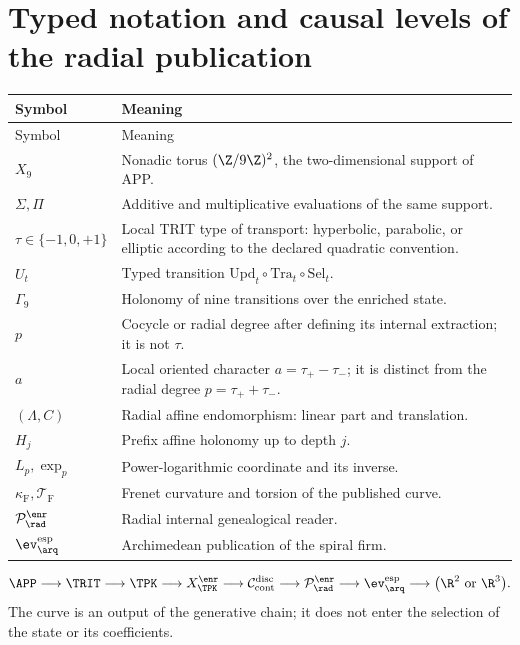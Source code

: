 \part{Typed notation and causal levels of the radial publication}
\begin{longtable}{>{\raggedright\arraybackslash}p{}p{}}
\toprule
Symbol & Meaning\\
\midrule
\endfirsthead
\toprule
Symbol & Meaning\\
\midrule
\endhead
\(X_9\) & Nonadic torus \((\Z/9\Z)^2\), the two-dimensional support of APP.\\
\(\Sigma,\Pi\) & Additive and multiplicative evaluations of the same support.\\
\(\tau\in\{-1,0,+1\}\) & Local TRIT type of transport: hyperbolic, parabolic, or elliptic according to the declared quadratic convention.\\
\(U_t\) & Typed transition \(\mathrm{Upd}_t\circ\mathrm{Tra}_t\circ\mathrm{Sel}_t\).\\
\(\Gamma_9\) & Holonomy of nine transitions over the enriched state.\\
\(p\) & Cocycle or radial degree after defining its internal extraction; it is not \(\tau\).\\
\(a\) & Local oriented character \(a=\tau_+-\tau_-\); it is distinct from the radial degree \(p=\tau_++\tau_-\).\\
\((\Lambda,C)\) & Radial affine endomorphism: linear part and translation.\\
\(H_j\) & Prefix affine holonomy up to depth \(j\).\\
\(L_p,\exp_p\) & Power-logarithmic coordinate and its inverse.\\
\(\kappa_{\mathrm{F}},\mathcal T_{\mathrm{F}}\) & Frenet curvature and torsion of the published curve.\\
\(\mathcal P^{\enr}_{\rad}\) & Radial internal genealogical reader.\\
\(\ev_{\arq}^{\mathrm{esp}}\) & Archimedean publication of the spiral firm.\\
\bottomrule
\end{longtable}

\begin{resultbox}[title={Causal composition from APP--TRIT--TPK to the radial Archimedean evaluation}]
\[
\APP\longrightarrow\TRIT\longrightarrow\TPK
\longrightarrow X_{\TPK}^{\enr}
\longrightarrow\mathcal C_{\mathrm{cont}}^{\mathrm{disc}}
\longrightarrow\mathcal P_{
  \rad}^{\enr}
\longrightarrow\ev_{\arq}^{\mathrm{esp}}
\longrightarrow\bigl(\R^2\ \text{or}\ \R^3\bigr).
\]
The curve is an output of the generative chain; it does not enter the selection
of the state or its coefficients.
\end{resultbox}
